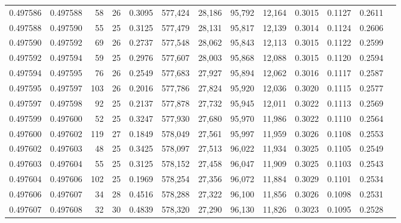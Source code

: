 \begin{tabular}{rrrrrrrrrrrrr}
0.497586 & 0.497588 &  58 &  26 &                                     0.3095 & 577,424 &  28,186 &  95,792 &  12,164 & 0.3015 & 0.1127 & 0.2611 \\
0.497588 & 0.497590 &  55 &  25 &                                     0.3125 & 577,479 &  28,131 &  95,817 &  12,139 & 0.3014 & 0.1124 & 0.2606 \\
0.497590 & 0.497592 &  69 &  26 &                                     0.2737 & 577,548 &  28,062 &  95,843 &  12,113 & 0.3015 & 0.1122 & 0.2599 \\
0.497592 & 0.497594 &  59 &  25 &                                     0.2976 & 577,607 &  28,003 &  95,868 &  12,088 & 0.3015 & 0.1120 & 0.2594 \\
0.497594 & 0.497595 &  76 &  26 &                                     0.2549 & 577,683 &  27,927 &  95,894 &  12,062 & 0.3016 & 0.1117 & 0.2587 \\
0.497595 & 0.497597 & 103 &  26 &                                     0.2016 & 577,786 &  27,824 &  95,920 &  12,036 & 0.3020 & 0.1115 & 0.2577 \\
0.497597 & 0.497598 &  92 &  25 &                                     0.2137 & 577,878 &  27,732 &  95,945 &  12,011 & 0.3022 & 0.1113 & 0.2569 \\
0.497599 & 0.497600 &  52 &  25 &                                     0.3247 & 577,930 &  27,680 &  95,970 &  11,986 & 0.3022 & 0.1110 & 0.2564 \\
0.497600 & 0.497602 & 119 &  27 &                                     0.1849 & 578,049 &  27,561 &  95,997 &  11,959 & 0.3026 & 0.1108 & 0.2553 \\
0.497602 & 0.497603 &  48 &  25 &                                     0.3425 & 578,097 &  27,513 &  96,022 &  11,934 & 0.3025 & 0.1105 & 0.2549 \\
0.497603 & 0.497604 &  55 &  25 &                                     0.3125 & 578,152 &  27,458 &  96,047 &  11,909 & 0.3025 & 0.1103 & 0.2543 \\
0.497604 & 0.497606 & 102 &  25 &                                     0.1969 & 578,254 &  27,356 &  96,072 &  11,884 & 0.3029 & 0.1101 & 0.2534 \\
0.497606 & 0.497607 &  34 &  28 &                                     0.4516 & 578,288 &  27,322 &  96,100 &  11,856 & 0.3026 & 0.1098 & 0.2531 \\
0.497607 & 0.497608 &  32 &  30 &                                     0.4839 & 578,320 &  27,290 &  96,130 &  11,826 & 0.3023 & 0.1095 & 0.2528 \\

\end{tabular}
